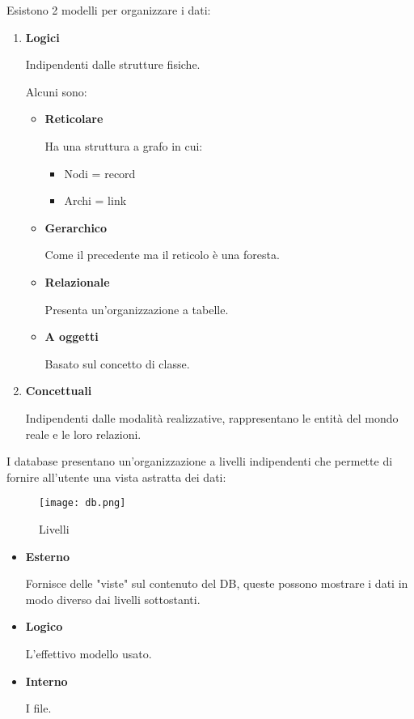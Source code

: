 \documentclass{article}
\begin{document}
\noindent Esistono 2 modelli per organizzare i dati:
\begin{enumerate}
    \item \textbf{Logici}

        Indipendenti dalle strutture fisiche.\newline

        Alcuni sono:
        \begin{itemize}
            \item \textbf{Reticolare}

                Ha una struttura a grafo in cui:
                \begin{itemize}
                    \item Nodi = record
                    \item Archi = link
                \end{itemize}

            \item \textbf{Gerarchico}

                Come il precedente ma il reticolo è una foresta.

            \item \textbf{Relazionale}

                Presenta un'organizzazione a tabelle.

            \item \textbf{A oggetti}

                Basato sul concetto di classe.
            
        \end{itemize}

    \item \textbf{Concettuali}

        Indipendenti dalle modalità realizzative, rappresentano le entità del mondo reale e le loro relazioni.
    
\end{enumerate}

\newpage

\noindent I database presentano un'organizzazione a livelli indipendenti che permette di fornire all'utente una vista astratta dei dati:

\begin{figure}[ht]
    \centering
    \texttt{[image: db.png]}
    \caption{Livelli}
    \label{fig:db_liv}
\end{figure}

\begin{itemize}
    \item \textbf{Esterno}

        Fornisce delle "viste" sul contenuto del DB, queste possono mostrare i dati in modo diverso dai livelli sottostanti.

    \item \textbf{Logico}

        L'effettivo modello usato.

    \item \textbf{Interno}

        I file.\newline
    
\end{itemize}
\end{document}
